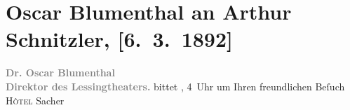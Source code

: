 

         
         \renewcommand{\erwaehntePersonen}{Personen: Oskar Blumenthal}
         \renewcommand{\erwaehnteInstitutionen}{Institutionen: Lessing-Theater}
         \renewcommand{\erwaehnteOrte}{Orte: Hotel Sacher, Wien}
         \renewcommand{\erwaehnteWerke}{}
               \section[Oscar Blumenthal an Arthur Schnitzler, {[}6. 3. 1892{]}]{ Oscar Blumenthal an Arthur Schnitzler, {[}6. 3. 1892{]}}\nopagebreak{}\rehead{ }\begin{ledgroupsized}[t]{13cm}\normalsize\beginnumbering \toendnotes[C]{\smallbreak\pagebreak[2]} 
\toendnotes[C]{\smallbreak}\pstart
           \noindent{}\centering{}{\pb}\textcolor{gray}{\textbf{Dr. Oscar Blumenthal}}{\\}\textcolor{gray}{\textbf{Direktor des Lessingtheaters.}}\pend
           \pstart
           \noindent{}bittet \label{K_L00077-1v}\label{K_L00077-1h}, 4 Uhr um Ihren freundlichen Beſuch \textsc{Hôtel}{ }Sacher\pend
           
         
         \endnumbering{}\end{ledgroupsized}  \newcommand{\dateiname}{L00077}\newcommand{\titel}{Oscar Blumenthal an Arthur Schnitzler, [6. 3. 1892]}\newcommand{\editorInnen}{Martin Anton Müller und Gerd-Hermann Susen}
      
